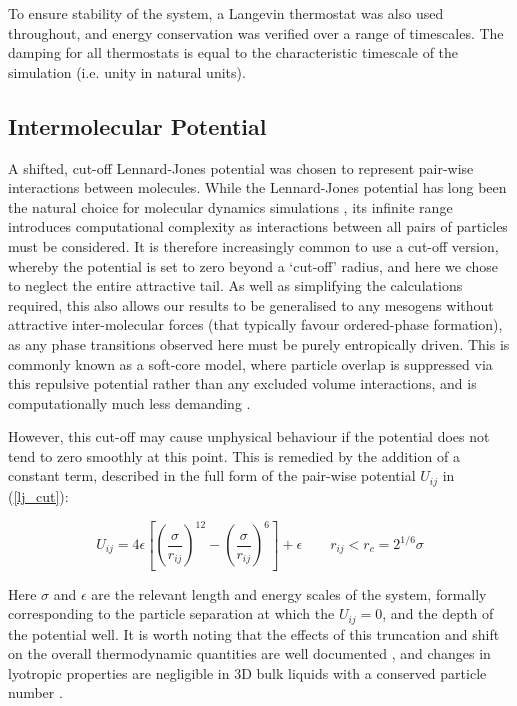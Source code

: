 \documentclass[11pt, a4paper]{article} %
\begin{document}
To ensure stability of the system, a Langevin thermostat \cite{Schneider1978} was also used throughout, and energy conservation was verified over a range of timescales. The damping for all thermostats is equal to the characteristic timescale of the simulation (i.e. unity in natural units).



\subsection{Intermolecular Potential} \label{pair_potential}
A shifted, cut-off Lennard-Jones potential was chosen to represent pair-wise interactions between molecules. While the Lennard-Jones potential \cite{Jones1924a, Jones1924b} has long been the natural choice for molecular dynamics simulations \cite{Stephan2019}, its infinite range introduces computational complexity as interactions between all pairs of particles must be considered. It is therefore increasingly common to use a cut-off version, whereby the potential is set to zero beyond a `cut-off' radius, and here we chose to neglect the entire attractive tail. As well as simplifying the calculations required, this also allows our results to be generalised to any mesogens without attractive inter-molecular forces (that typically favour ordered-phase formation), as any phase transitions observed here must be purely entropically driven. This is commonly known as a soft-core model, where particle overlap is suppressed via this repulsive potential rather than any excluded volume interactions, and is computationally much less demanding \cite{Paolini1993, Hughes2008}.

However, this cut-off may cause unphysical behaviour if the potential does not tend to zero smoothly at this point. This is remedied by the addition of a constant term, described in the full form of the pair-wise potential $U_{ij}$ in (\ref{lj_cut}):

\begin{equation} \label{lj_cut}
U_{ij} = 4\epsilon \left[ \left( \frac{\sigma}{r_{ij}} \right) ^{12} - \left( \frac{\sigma}{r_{ij}} \right) ^{6}	\right] + \epsilon \qquad	 r_{ij} < r_{c} = 2^{1/6} \sigma
\end{equation}

Here $\sigma$ and $\epsilon$ are the relevant length and energy scales of the system, formally corresponding to the particle separation at which the $U_{ij} = 0$, and the depth of the potential well. It is worth noting that the effects of this truncation and shift on the overall thermodynamic quantities are well documented \cite{Stephan2020, Shaul2010}, and changes in lyotropic properties are negligible in 3D bulk liquids with a conserved particle number \cite{Smit1991}. 
\end{document}
